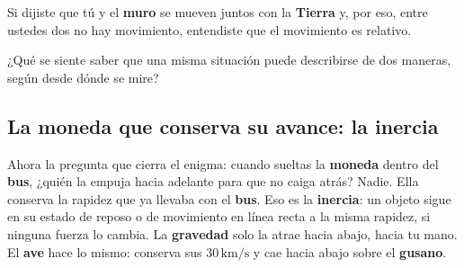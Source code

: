 \documentclass[
  spanish,
  letterpaper,
  12pt,
  oneside,
  open=any,
  DIV=15]{scrbook}
\begin{document}
\begin{tcolorbox}[enhanced jigsaw, arc=.35mm, bottomrule=.15mm, bottomtitle=1mm, breakable, colback=white, colbacktitle=quarto-callout-tip-color!10!white, colframe=quarto-callout-tip-color-frame, coltitle=black, left=2mm, leftrule=.75mm, opacityback=0, opacitybacktitle=0.6, rightrule=.15mm, title=\textcolor{quarto-callout-tip-color}{\faLightbulb}\hspace{0.5em}{Apoyo Procedimental (Comprobación)}, titlerule=0mm, toprule=.15mm, toptitle=1mm]

Si dijiste que tú y el \textbf{muro} se mueven juntos con la
\textbf{Tierra} y, por eso, entre ustedes dos no hay movimiento,
entendiste que el movimiento es relativo.

\end{tcolorbox}

\begin{tcolorbox}[enhanced jigsaw, arc=.35mm, bottomrule=.15mm, bottomtitle=1mm, breakable, colback=white, colbacktitle=quarto-callout-note-color!10!white, colframe=quarto-callout-note-color-frame, coltitle=black, left=2mm, leftrule=.75mm, opacityback=0, opacitybacktitle=0.6, rightrule=.15mm, title=\textcolor{quarto-callout-note-color}{\faInfo}\hspace{0.5em}{Pregunta socioemocional}, titlerule=0mm, toprule=.15mm, toptitle=1mm]

¿Qué se siente saber que una misma situación puede describirse de dos
maneras, según desde dónde se mire?

\end{tcolorbox}

\subsection{La moneda que conserva su avance: la
inercia}\label{la-moneda-que-conserva-su-avance-la-inercia}

Ahora la pregunta que cierra el enigma: cuando sueltas la
\textcolor[HTML]{2563EB}{\textbf{moneda}} dentro del
\textcolor[HTML]{7C3AED}{\textbf{bus}}, ¿quién la empuja hacia adelante
para que no caiga atrás? Nadie. Ella conserva la rapidez que ya llevaba
con el \textcolor[HTML]{7C3AED}{\textbf{bus}}. Eso es la
\textbf{inercia}: un objeto sigue en su estado de reposo o de movimiento
en línea recta a la misma rapidez, si ninguna fuerza lo cambia. La
\textbf{gravedad} solo la atrae hacia abajo, hacia tu mano. El
\textcolor[HTML]{2563EB}{\textbf{ave}} hace lo mismo: conserva sus
\(30\,\text{km/s}\) y cae hacia abajo sobre el
\textcolor[HTML]{2563EB}{\textbf{gusano}}.
\end{document}
